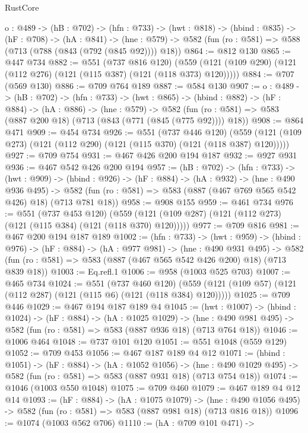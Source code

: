 \begin{lexlean}{RustCore}
\begin{coremodule}
  {o : @489} ->
  (hB : @702) ->
  (hfn : @733) ->
  (hwt : @818) ->
  (hbind : @835) ->
  (hF : @708) ->
  (hA : @841) ->
  (hne : @579) -> @582 (fun (ro : @581) => @588 (@713 (@788 (@843 (@792 (@845 @92)))) @18))
@864 := @812 @130
@865 := @447 @734
@882 := @551
    (@737 @816 @120)
    (@559 (@121 (@109 @290) (@121 (@112 @276) (@121 (@115 @387) (@121 (@118 @373) @120)))))
@884 := @707 (@569 @130)
@886 := @709 @764 @189
@887 := @584 @130
@907 := {o : @489} ->
  (hB : @702) ->
  (hfn : @733) ->
  (hwt : @865) ->
  (hbind : @882) ->
  (hF : @884) ->
  (hA : @886) ->
  (hne : @579) ->
  @582 (fun (ro : @581) => @583 (@887 @200 @18) (@713 (@843 (@771 (@845 (@775 @92)))) @18))
@908 := @864 @471
@909 := @454 @734
@926 := @551
    (@737 @446 @120)
    (@559 (@121 (@109 @273) (@121 (@112 @290) (@121 (@115 @370) (@121 (@118 @387) @120)))))
@927 := @709 @754
@931 := @467 @426 @200 @194 @187
@932 := @927 @931
@936 := @467 @542 @426 @200 @194
@957 := (hB : @702) ->
  (hfn : @733) ->
  (hwt : @909) ->
  (hbind : @926) ->
  (hF : @884) ->
  (hA : @932) ->
  (hne : @490 @936 @495) ->
  @582 (fun (ro : @581) => @583 (@887 (@467 @769 @565 @542 @426) @18) (@713 @781 @18))
@958 := @908 @155
@959 := @461 @734
@976 := @551
    (@737 @453 @120)
    (@559 (@121 (@109 @287) (@121 (@112 @273) (@121 (@115 @384) (@121 (@118 @370) @120)))))
@977 := @709 @816
@981 := @467 @200 @194 @187 @189
@1002 := (hfn : @733) ->
  (hwt : @959) ->
  (hbind : @976) ->
  (hF : @884) ->
  (hA : @977 @981) ->
  (hne : @490 @931 @495) ->
  @582 (fun (ro : @581) => @583 (@887 (@467 @565 @542 @426 @200) @18) (@713 @839 @18))
@1003 := Eq.refl.{1}
@1006 := @958 (@1003 @525 @703)
@1007 := @465 @734
@1024 := @551
    (@737 @460 @120)
    (@559 (@121 (@109 @57) (@121 (@112 @287) (@121 (@115 @6) (@121 (@118 @384) @120)))))
@1025 := @709 @446
@1029 := @467 @194 @187 @189 @4
@1045 := (hwt : @1007) ->
  (hbind : @1024) ->
  (hF : @884) ->
  (hA : @1025 @1029) ->
  (hne : @490 @981 @495) -> @582 (fun (ro : @581) => @583 (@887 @936 @18) (@713 @764 @18))
@1046 := @1006 @464
@1048 := @737 @101 @120
@1051 := @551 @1048 (@559 @129)
@1052 := @709 @453
@1056 := @467 @187 @189 @4 @12
@1071 := (hbind : @1051) ->
  (hF : @884) ->
  (hA : @1052 @1056) ->
  (hne : @490 @1029 @495) -> @582 (fun (ro : @581) => @583 (@887 @931 @18) (@713 @754 @18))
@1074 := @1046 (@1003 @550 @1048)
@1075 := @709 @460
@1079 := @467 @189 @4 @12 @14
@1093 := (hF : @884) ->
  (hA : @1075 @1079) ->
  (hne : @490 @1056 @495) -> @582 (fun (ro : @581) => @583 (@887 @981 @18) (@713 @816 @18))
@1096 := @1074 (@1003 @562 @706)
@1110 := (hA : @709 @101 @471) ->

\end{coremodule}
\end{lexlean}
